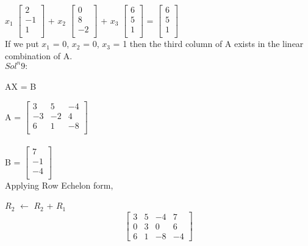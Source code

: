 \documentclass{article}
\begin{document}
$x_1$ $\begin{bmatrix}
    2 \\
    -1 \\
    1 \\
    \end{bmatrix}$ + $x_2$ $\begin{bmatrix}
    0\\
    8 \\
    -2 \\
    \end{bmatrix}$ + $x_3$ $\begin{bmatrix}
    6\\
    5 \\
    1 \\
    \end{bmatrix}$ = $\begin{bmatrix}
    6\\
    5 \\
    1 \\
    \end{bmatrix}$ \\
    
If we put $x_1$ = 0, $x_2$ = 0, $x_3$ = 1 then the third column of A exists in the linear combination of A. \\

$Sol^n 9:$ \\ \\ 
AX = B

A = $\begin{bmatrix}
    3 & 5 & -4\\
    -3 & -2 & 4 \\
    6 & 1 & -8 \\
    \end{bmatrix}$ \\ \\
    
B = $\begin{bmatrix}
    7\\
    -1 \\
    -4 \\
    \end{bmatrix}$ \\
    
Applying Row Echelon form,

$R_2$ $\leftarrow$ $R_2$ + $R_1$\\
$$
  \left[\begin{array}{rrr|r}
    3 & 5 & -4 & 7 \\
    0 & 3 & 0 & 6 \\
    6 & 1 & -8 & -4
  \end{array}\right]
$$ \\
\end{document}
